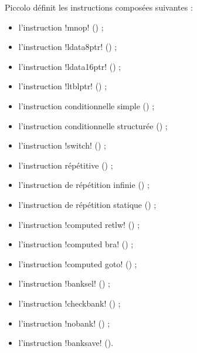
Piccolo définit les instructions composées suivantes :
\begin{itemize}
  \item l'instruction \pic!mnop! () ;
  \item l'instruction \pic!ldata8ptr! () ;
  \item l'instruction \pic!ldata16ptr! () ;
  \item l'instruction \pic!ltblptr! () ;
  \item l'instruction conditionnelle simple () ;
  \item l'instruction conditionnelle structurée () ;
  \item l'instruction \pic!switch! () ;
  \item l'instruction répétitive () ;
  \item l'instruction de répétition infinie () ;
  \item l'instruction de répétition statique () ;
  \item l'instruction \pic!computed retlw! () ;
  \item l'instruction \pic!computed bra! () ;
  \item l'instruction \pic!computed goto! () ;
  \item l'instruction \pic!banksel! () ;
  \item l'instruction \pic!checkbank! () ;
  \item l'instruction \pic!nobank! () ;
  \item l'instruction \pic!banksave! ().
\end{itemize}





